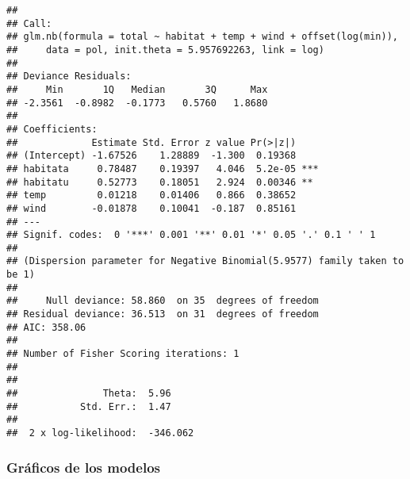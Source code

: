 \documentclass[
]{book}
\newenvironment{Shaded}{\begin{snugshade}}{\end{snugshade}}
\newcommand{\DataTypeTok}[1]{\textcolor[rgb]{0.13,0.29,0.53}{#1}}
\newcommand{\DecValTok}[1]{\textcolor[rgb]{0.00,0.00,0.81}{#1}}
\newcommand{\KeywordTok}[1]{\textcolor[rgb]{0.13,0.29,0.53}{\textbf{#1}}}
\newcommand{\NormalTok}[1]{#1}
\newcommand{\OperatorTok}[1]{\textcolor[rgb]{0.81,0.36,0.00}{\textbf{#1}}}
\newcommand{\StringTok}[1]{\textcolor[rgb]{0.31,0.60,0.02}{#1}}
\begin{document}
\begin{verbatim}
## 
## Call:
## glm.nb(formula = total ~ habitat + temp + wind + offset(log(min)), 
##     data = pol, init.theta = 5.957692263, link = log)
## 
## Deviance Residuals: 
##     Min       1Q   Median       3Q      Max  
## -2.3561  -0.8982  -0.1773   0.5760   1.8680  
## 
## Coefficients:
##             Estimate Std. Error z value Pr(>|z|)    
## (Intercept) -1.67526    1.28889  -1.300  0.19368    
## habitata     0.78487    0.19397   4.046  5.2e-05 ***
## habitatu     0.52773    0.18051   2.924  0.00346 ** 
## temp         0.01218    0.01406   0.866  0.38652    
## wind        -0.01878    0.10041  -0.187  0.85161    
## ---
## Signif. codes:  0 '***' 0.001 '**' 0.01 '*' 0.05 '.' 0.1 ' ' 1
## 
## (Dispersion parameter for Negative Binomial(5.9577) family taken to be 1)
## 
##     Null deviance: 58.860  on 35  degrees of freedom
## Residual deviance: 36.513  on 31  degrees of freedom
## AIC: 358.06
## 
## Number of Fisher Scoring iterations: 1
## 
## 
##               Theta:  5.96 
##           Std. Err.:  1.47 
## 
##  2 x log-likelihood:  -346.062
\end{verbatim}

\hypertarget{gruxe1ficos-de-los-modelos}{%
\subsubsection{Gráficos de los modelos}\label{gruxe1ficos-de-los-modelos}}

\begin{Shaded}
\end{Shaded}
\end{document}
